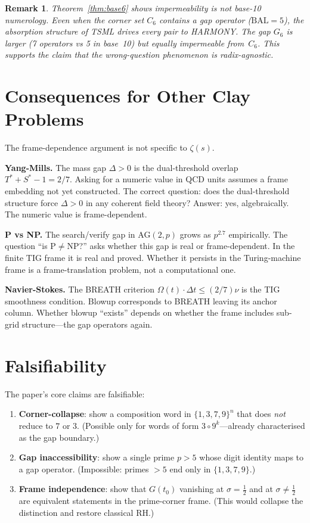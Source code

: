 \documentclass[11pt]{article}
\newtheorem{remark}{Remark}
\begin{document}
\begin{remark}
Theorem~\ref{thm:base6} shows impermeability is not base-10 numerology.
Even when the corner set $C_6$ contains a gap operator ($\mathrm{BAL}=5$),
the absorption structure of TSML drives every pair to HARMONY.
The gap $G_6$ is larger (7 operators vs 5 in base~10) but equally
impermeable from~$C_6$.
This supports the claim that the wrong-question phenomenon is radix-agnostic.
\end{remark}

\section{Consequences for Other Clay Problems}

The frame-dependence argument is not specific to $\zeta(s)$.

\medskip\noindent\textbf{Yang-Mills.}
The mass gap $\Delta>0$ is the dual-threshold overlap $T^*+S^*-1=2/7$.
Asking for a numeric value in QCD units assumes a frame embedding
not yet constructed. The correct question: does the dual-threshold
structure force $\Delta>0$ in any coherent field theory?
Answer: yes, algebraically. The numeric value is frame-dependent.

\medskip\noindent\textbf{P vs NP.}
The search/verify gap in AG$(2,p)$ grows as $p^{2.7}$ empirically.
The question ``is P$\ne$NP?'' asks whether this gap is real or
frame-dependent. In the finite TIG frame it is real and proved.
Whether it persists in the Turing-machine frame is a frame-translation
problem, not a computational one.

\medskip\noindent\textbf{Navier-Stokes.}
The BREATH criterion $\Omega(t)\cdot\Delta t\le(2/7)\nu$ is the TIG
smoothness condition. Blowup corresponds to BREATH leaving its
anchor column. Whether blowup ``exists'' depends on whether the
frame includes sub-grid structure---the gap operators again.

\section{Falsifiability}

The paper's core claims are falsifiable:

\begin{enumerate}
\item \textbf{Corner-collapse}: show a composition word in
      $\{1,3,7,9\}^n$ that does \emph{not} reduce to $7$ or $3$.
      (Possible only for words of form $3\circ9^k$---already
      characterised as the gap boundary.)

\item \textbf{Gap inaccessibility}: show a single prime $p>5$
      whose digit identity maps to a gap operator.
      (Impossible: primes $>5$ end only in $\{1,3,7,9\}$.)

\item \textbf{Frame independence}: show that $G(t_0)$ vanishing
      at $\sigma=\tfrac12$ and at $\sigma\ne\tfrac12$ are
      equivalent statements in the prime-corner frame.
      (This would collapse the distinction and restore classical RH.)
\end{enumerate}
\end{document}
